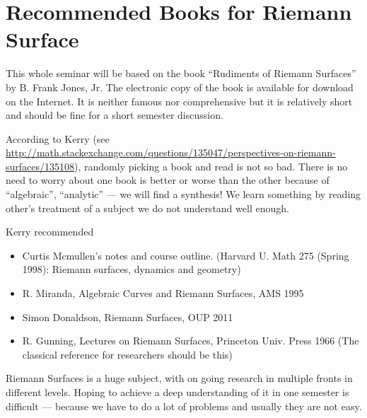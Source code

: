 \documentclass[a4paper,11pt]{article}
\begin{document}
\section{Recommended Books for Riemann Surface}

This whole seminar will be based on the book ``Rudiments of Riemann
Surfaces'' by B. Frank Jones, Jr.  The electronic copy of the book
is available for download on the Internet.  It is neither famous nor
comprehensive but it is relatively short and should be fine for a
short semester discussion.

According to Kerry (see
\url{http://math.stackexchange.com/questions/135047/perspectives-on-riemann-surfaces/135108}),
randomly picking a book and read is not so bad.  There is no need to
worry about one book is better or worse than the other because of
``algebraic'', ``analytic'' --- we will find a synthesis!  We learn
something by reading other's treatment of a subject we do not
understand well enough.

Kerry recommended
\begin{itemize}
\item Curtis Mcmullen's notes and course outline.
  (Harvard U. Math 275 (Spring 1998): Riemann surfaces, dynamics and
  geometry)
\item R. Miranda, Algebraic Curves and Riemann Surfaces, AMS 1995
\item Simon Donaldson, Riemann Surfaces, OUP 2011 %
\item R. Gunning, Lectures on Riemann Surfaces, Princeton Univ. Press
  1966 (The classical reference for researchers should be this)
\end{itemize}

Riemann Surfaces is a huge subject, with on going research in multiple
fronts in different levels. Hoping to achieve a deep understanding of
it in one semester is difficult --- because we have to do a lot of
problems and usually they are not easy.
\end{document}
